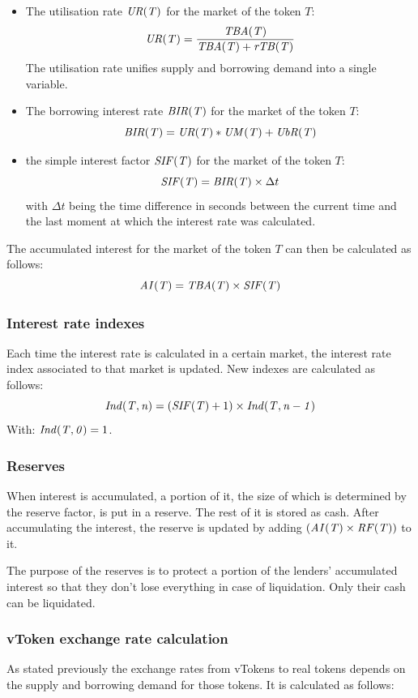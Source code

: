 \begin{itemize}
  \item The utilisation rate $\mathit{UR(T)}$ for the market of the token $T$:
  $$
    \mathit{UR(T)} = \frac{ \mathit{TBA(T)} }{ \mathit{TBA(T)} + \mathit{rTB(T)} }
  $$
  The utilisation rate unifies supply and borrowing demand into a single variable.
  \item The borrowing interest rate $\mathit{BIR(T)}$ for the market of the token $T$:
  $$
    \mathit{BIR(T)} = \mathit{UR(T)} * \mathit{UM(T)} + \mathit{UbR(T)}
  $$
  \item the simple interest factor $\mathit{SIF(T)}$ for the market of the token $T$:
  $$
    \mathit{SIF(T)} = \mathit{BIR(T)} \times \Delta t
  $$
  with $\Delta t$ being the time difference in seconds between the current time and the last moment at which the interest rate was calculated.
\end{itemize}
The accumulated interest for the market of the token $T$ can then be calculated as follows:
$$
  \mathit{AI(T)} = \mathit{TBA(T)} \times \mathit{SIF(T)}
$$

\subsubsection{Interest rate indexes}

Each time the interest rate is calculated in a certain market, the interest rate index associated to that market is updated. New indexes are calculated as follows:
$$
\mathit{Ind(T, n)} = (\mathit{SIF(T)} + 1) \times\mathit{Ind(T, n-1)}
$$
With: $\mathit{Ind(T, 0)} = 1$.

\subsubsection{Reserves}

When interest is accumulated, a portion of it, the size of which is determined by the reserve factor, is put in a reserve. The rest of it is stored as cash. After accumulating the interest, the reserve is updated by adding $(\mathit{AI(T)} \times \mathit{RF(T)})$ to it.

The purpose of the reserves is to protect a portion of the lenders' accumulated interest so that they don't lose everything in case of liquidation. Only their cash can be liquidated.

\subsubsection{vToken exchange rate calculation}

As stated previously the exchange rates from vTokens to real tokens depends on the supply and borrowing demand for those tokens. It is calculated as follows:

